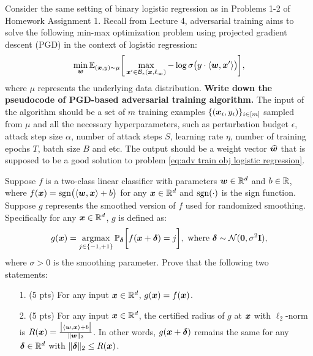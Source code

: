 \documentclass[11pt]{article}
\begin{document}
\begin{problem}[10 pts]
\label{problem:1}
\rm
Consider the same setting of binary logistic regression as in Problems 1-2 of Homework Assignment 1. Recall from Lecture 4, adversarial training aims to solve the following min-max optimization problem using projected gradient descent (PGD) in the context of logistic regression:
\begin{align}
\label{eq:adv train obj logistic regression}
    \min_{\bm{w}} \mathbb{E}_{(\bm{x},y)\sim\mu} \bigg[\max_{\bm{x}'\in\mathcal{B}_\epsilon(\bm{x}, \ell_\infty)} -\log \sigma\big(y\cdot \langle \bm{w}, \bm{x}' \rangle\big) \bigg], 
\end{align}
where $\mu$ represents the underlying data distribution. \textbf{Write down the pseudocode of PGD-based adversarial training algorithm.} The input of the algorithm should be a set of $m$ training examples $\{(\bm{x}_i, y_i)\}_{i\in[m]}$ sampled from $\mu$ and all the necessary hyperparameters, such as perturbation budget $\epsilon$, attack step size $\alpha$, number of attack steps $S$, learning rate $\eta$, number of training epochs $T$, batch size $B$ and etc. The output should be a weight vector $\widehat{\bm{w}}$ that is supposed to be a good solution to problem \eqref{eq:adv train obj logistic regression}.
\end{problem}




\directions{\clearpage}



\begin{problem}[10 pts]
\label{problem:2}
\rm
Suppose $f$ is a two-class linear classifier with parameters $\bm{w}\in\mathbb{R}^d$ and $b\in\mathbb{R}$, where $f(\bm{x}) = \mathrm{sgn}\big(\langle \bm{w}, \bm{x} \rangle + b\big)$ for any $\bm{x}\in\mathbb{R}^d$ and $\mathrm{sgn}(\cdot)$ is the sign function.
Suppose $g$ represents the smoothed version of $f$ used for randomized smoothing. Specifically for any $\bm{x}\in\mathbb{R}^d$, $g$ is defined as:
\begin{align*}
    g(\bm{x}) = \operatorname*{argmax}_{j\in\{-1, +1\}} \mathbb{P}_{\bm\delta}\bigg[ f(\bm{x}+\bm\delta) = j\bigg], \text{ where } \bm\delta \sim\mathcal{N}(\bm{0}, \sigma^2\mathbf{I}),
\end{align*}
where $\sigma>0$ is the smoothing parameter. Prove that the following two statements:
\begin{enumerate}
    \item[1.] (5 pts) For any input $\bm{x}\in\mathbb{R}^d$, $g(\bm{x}) = f(\bm{x})$.
    \item[2.] (5 pts) For any input $\bm{x}\in\mathbb{R}^d$, the certified radius of $g$ at $\bm{x}$ with $\ell_2$-norm is $R(\bm{x}) = \frac{\big|\langle \bm{w}, \bm{x} \rangle + b\big|}{\|\bm{w}\|_2}$. In other words, $g(\bm{x}+\bm\delta)$ remains the same for any $\bm\delta\in\mathbb{R}^d$ with $\|\bm\delta\|_2\leq R(\bm{x})$.
\end{enumerate}
\end{problem}
\end{document}
